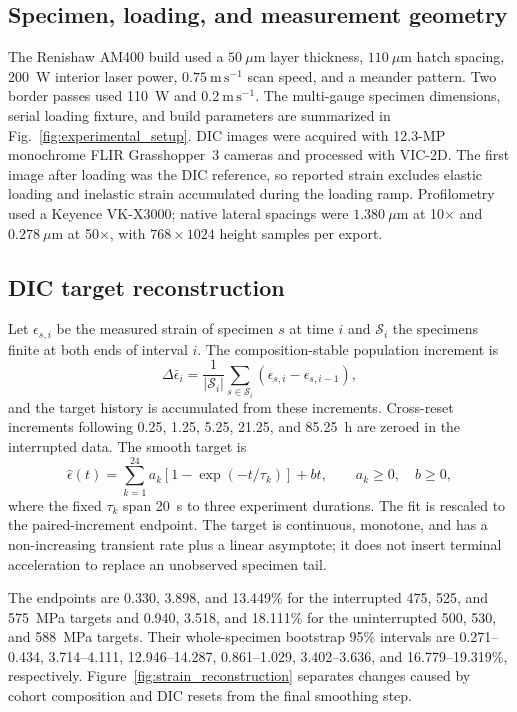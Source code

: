 \documentclass[final,12pt]{cas-sc}
\begin{document}
\subsection{Specimen, loading, and measurement geometry}

The Renishaw AM400 build used a $50~\mu$m layer thickness, $110~\mu$m hatch
spacing, 200~W interior laser power, $0.75~\mathrm{m\,s^{-1}}$ scan speed, and
a meander pattern. Two border passes used 110~W and
$0.2~\mathrm{m\,s^{-1}}$. The multi-gauge specimen dimensions, serial loading
fixture, and build parameters are summarized in
Fig.~\ref{fig:experimental_setup}. DIC images were acquired with 12.3-MP
monochrome FLIR Grasshopper~3 cameras and processed with VIC-2D. The first
image after loading was the DIC reference, so reported strain excludes
elastic loading and inelastic strain accumulated during the loading ramp.
Profilometry used a Keyence VK-X3000; native lateral spacings were
$1.380~\mu$m at 10$\times$ and $0.278~\mu$m at 50$\times$, with
$768\times1024$ height samples per export.

\subsection{DIC target reconstruction}

Let $\epsilon_{s,i}$ be the measured strain of specimen $s$ at time $i$ and
$\mathcal{S}_i$ the specimens finite at both ends of interval $i$. The
composition-stable population increment is
\begin{equation}
\Delta\bar{\epsilon}_i =
\frac{1}{|\mathcal{S}_i|}
\sum_{s\in\mathcal{S}_i}
\left(\epsilon_{s,i}-\epsilon_{s,i-1}\right),
\end{equation}
and the target history is accumulated from these increments. Cross-reset
increments following 0.25, 1.25, 5.25, 21.25, and 85.25~h are zeroed in the
interrupted data. The smooth target is
\begin{equation}
\widehat{\epsilon}(t)=
\sum_{k=1}^{24} a_k
\left[1-\exp\left(-t/\tau_k\right)\right]+bt,
\qquad a_k\geq0,\quad b\geq0,
\end{equation}
where the fixed $\tau_k$ span 20~s to three experiment durations. The fit is
rescaled to the paired-increment endpoint. The target is continuous,
monotone, and has a non-increasing transient rate plus a linear asymptote; it
does not insert terminal acceleration to replace an unobserved specimen tail.

The endpoints are 0.330, 3.898, and 13.449\% for the interrupted 475, 525,
and 575~MPa targets and 0.940, 3.518, and 18.111\% for the uninterrupted 500,
530, and 588~MPa targets. Their whole-specimen bootstrap 95\% intervals are
0.271--0.434, 3.714--4.111, 12.946--14.287, 0.861--1.029, 3.402--3.636, and
16.779--19.319\%, respectively. Figure~\ref{fig:strain_reconstruction}
separates changes caused by cohort composition and DIC resets from the final
smoothing step.
\end{document}
